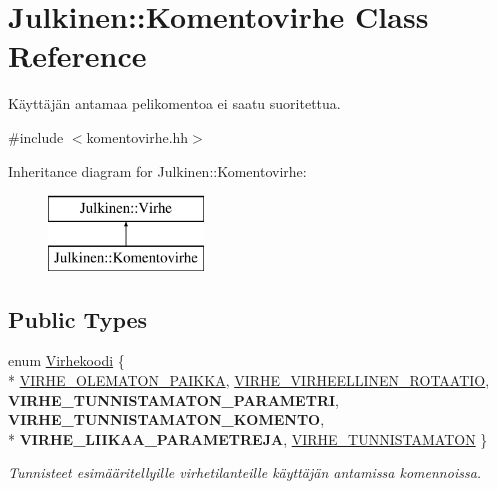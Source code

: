 \hypertarget{class_julkinen_1_1_komentovirhe}{}\section{Julkinen\+:\+:Komentovirhe Class Reference}
\label{class_julkinen_1_1_komentovirhe}


Käyttäjän antamaa pelikomentoa ei saatu suoritettua.  




{\ttfamily \#include $<$komentovirhe.\+hh$>$}

Inheritance diagram for Julkinen\+:\+:Komentovirhe\+:\begin{figure}[H]
\begin{center}
\leavevmode
\includegraphics[height=2.000000cm]{class_julkinen_1_1_komentovirhe}
\end{center}
\end{figure}
\subsection*{Public Types}
\begin{DoxyCompactItemize}
\item 
enum \hyperlink{class_julkinen_1_1_komentovirhe_ad45b4895d16e53f115875f2e2a1518e3}{Virhekoodi} \{ \\*
\hyperlink{class_julkinen_1_1_komentovirhe_ad45b4895d16e53f115875f2e2a1518e3ad138f8f3c9591bd14fe68ac15a9fa9c5}{V\+I\+R\+H\+E\+\_\+\+O\+L\+E\+M\+A\+T\+O\+N\+\_\+\+P\+A\+I\+K\+K\+A}, 
\hyperlink{class_julkinen_1_1_komentovirhe_ad45b4895d16e53f115875f2e2a1518e3ab36ab3ed54b561768d5815d4dbef8cd2}{V\+I\+R\+H\+E\+\_\+\+V\+I\+R\+H\+E\+E\+L\+L\+I\+N\+E\+N\+\_\+\+R\+O\+T\+A\+A\+T\+I\+O}, 
{\bfseries V\+I\+R\+H\+E\+\_\+\+T\+U\+N\+N\+I\+S\+T\+A\+M\+A\+T\+O\+N\+\_\+\+P\+A\+R\+A\+M\+E\+T\+R\+I}, 
{\bfseries V\+I\+R\+H\+E\+\_\+\+T\+U\+N\+N\+I\+S\+T\+A\+M\+A\+T\+O\+N\+\_\+\+K\+O\+M\+E\+N\+T\+O}, 
\\*
{\bfseries V\+I\+R\+H\+E\+\_\+\+L\+I\+I\+K\+A\+A\+\_\+\+P\+A\+R\+A\+M\+E\+T\+R\+E\+J\+A}, 
\hyperlink{class_julkinen_1_1_komentovirhe_ad45b4895d16e53f115875f2e2a1518e3a54f39d45fd85a02c18678c416337b4d8}{V\+I\+R\+H\+E\+\_\+\+T\+U\+N\+N\+I\+S\+T\+A\+M\+A\+T\+O\+N}
 \}\begin{DoxyCompactList}\small\item\em Tunnisteet esimääritellyille virhetilanteille käyttäjän antamissa komennoissa. \end{DoxyCompactList}
\end{DoxyCompactItemize}
